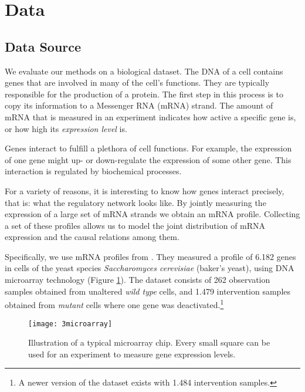 \newpage
\section{Data}
\label{chapter:data}


\subsection{Data Source}

We evaluate our methods on a biological dataset. The DNA of a cell contains genes that are involved in many of the cell's functions. They are typically responsible for the production of a protein. The first step in this process is to copy its information to a Messenger RNA (mRNA) strand. The amount of mRNA that is measured in an experiment indicates how active a specific gene is, or how high its \textit{expression level} is.

Genes interact to fulfill a plethora of cell functions. For example, the expression of one gene might up- or down-regulate the expression of some other gene. This interaction is regulated by biochemical processes. 

For a variety of reasons, it is interesting to know how genes interact precisely, that is: what the regulatory network looks like. By jointly measuring the expression of a large set of mRNA strands we obtain an mRNA profile. Collecting a set of these profiles allows us to model the joint distribution of mRNA expression and the causal relations among them.

Specifically, we use mRNA profiles from \citet{kemmeren2014large}. They measured a profile of 6.182 genes in cells of the yeast species \textit{Saccharomyces cerevisiae} (baker's yeast), using DNA microarray technology (Figure \ref{fig:3:microarray}). The dataset consists of 262 observation samples obtained from unaltered \textit{wild type} cells, and 1.479 intervention samples obtained from \textit{mutant} cells where one gene was deactivated.\footnote{A newer version of the dataset exists with 1.484 intervention samples.}

\begin{figure}[h]
    \centering
    \texttt{[image: 3microarray]}
    \caption{Illustration of a typical microarray chip. Every small square can be used for an experiment to measure gene expression levels.\protect\footnotemark}
    \label{fig:3:microarray}
\end{figure}

